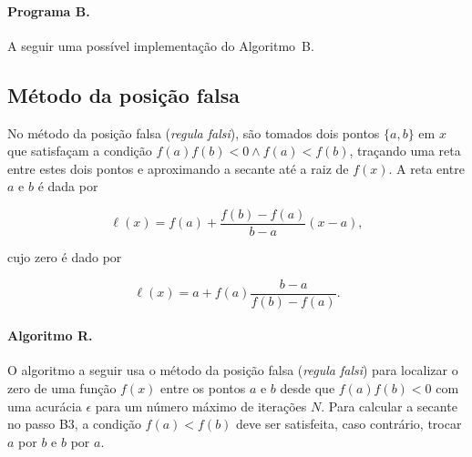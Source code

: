 \pagebreak
\paragraph{Programa B.} A seguir uma possível implementação 
do Algoritmo~B.



\subsection*{Método da posição falsa}

No método da posição falsa ({\it regula falsi\/}), 
são tomados dois pontos $\{a,b\}$ em $x$ que satisfaçam 
a condição $f(a)f(b)<0 \land f(a)<f(b)$, traçando 
uma reta entre estes dois pontos e aproximando a 
secante até a raiz de $f(x)$. A reta entre $a$ 
e $b$ é dada por

\begin{equation}
	\ell(x) = f(a) + \frac{f(b)-f(a)}{b-a}(x-a),
\end{equation}

\noindent cujo zero é dado por

\begin{equation}
	\ell(x) = a + f(a)\frac{b-a}{f(b)-f(a)}.
\end{equation}

\paragraph{Algoritmo R.}
O algoritmo a seguir usa o método da posição falsa 
({\it regula falsi\/}) para 
localizar o zero de uma função $f(x)$ 
entre os pontos $a$ e $b$ desde que $f(a)f(b)<0$ 
com uma acurácia $\epsilon$ para um número máximo 
de iterações $N$. Para calcular a secante no passo
B3, a condição $f(a)<f(b)$ deve ser satisfeita, caso
contrário, trocar $a$ por $b$ e $b$ por $a$.


